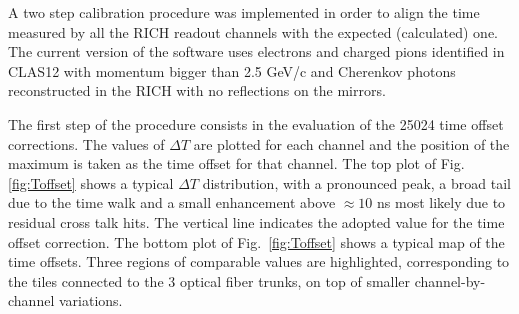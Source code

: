 \documentclass[5p,times,twocolumn]{elsarticle}
\begin{document}
A two step calibration procedure was implemented in order to align the time measured by all the RICH readout channels with the expected (calculated) one. The current version of the software uses electrons and charged pions identified in CLAS12 with momentum bigger than 2.5 GeV/c and Cherenkov photons reconstructed in the RICH with no reflections on the mirrors.

The first step of the procedure consists in the evaluation of the 25024 time offset corrections. The values of $\Delta T$ are plotted for each channel and the position of the maximum is taken as the time offset for that channel. The top plot of Fig.\ref{fig:Toffset} shows a typical $\Delta T$ distribution, with a pronounced peak, a broad tail due to the time walk and a small enhancement above $\approx 10$ ns most likely due to residual cross talk hits. The vertical line indicates the adopted value for the time offset correction.
The bottom plot of Fig.~\ref{fig:Toffset} shows a typical map of the time offsets. Three regions of comparable values are highlighted, corresponding to the tiles connected to the 3 optical fiber trunks, on top of smaller channel-by-channel variations.
\end{document}
